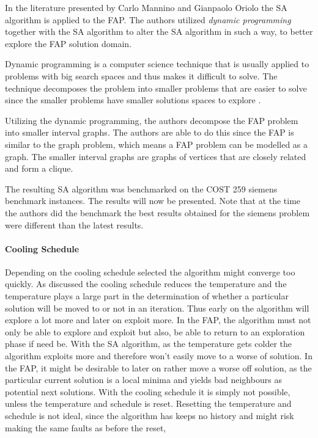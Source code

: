 In the literature presented by Carlo Mannino and Gianpaolo Oriolo\cite{SolvingSuperIntervalGraphs} the SA algorithm is applied to the FAP. The authors utilized \emph{dynamic programming} together with the SA algorithm to alter the SA algorithm in such a way, to better explore the FAP solution domain.

Dynamic programming is a computer science technique that is usually applied to problems with big search spaces and thus makes it difficult to solve\cite{AIModernApproach}. The technique decomposes the problem into smaller problems that are easier to solve since the smaller problems have smaller solutions spaces to explore \cite{AIModernApproach,IntroMathProgramming}.

Utilizing the dynamic programming, the authors decompose the FAP problem into smaller interval graphs. The authors are able to do this since the FAP is similar to the graph problem, which means a FAP problem can be modelled as a graph\cite{ProblemDecompMIFAP}. The smaller interval graphs are graphs of vertices that are closely related and form a clique\cite{ProblemDecompMIFAP}.

The resulting SA algorithm was benchmarked on the COST 259 siemens benchmark instances. The results will now be presented. Note that at the time the authors did the benchmark the best results obtained for the siemens problem were different than the latest results.
\paragraph{Cooling Schedule}
Depending on the cooling schedule selected the algorithm might converge too quickly. As discussed the cooling schedule reduces the temperature and the temperature plays a large part in the determination of whether a particular solution will be moved to or not in an iteration. Thus early on the algorithm will explore a lot more and later on exploit more. In the FAP, the algorithm must not only be able to explore and exploit but also, be able to return to an exploration phase if need be.
With the SA algorithm, as the temperature gets colder the algorithm exploits more and therefore won't easily move to a worse of solution. In the FAP, it might be desirable to later on rather move a worse off solution, as the particular current solution is a local minima and yields bad neighbours as potential next solutions. With the cooling schedule it is simply not possible, unless the temperature and schedule is reset. Resetting the temperature and schedule is not ideal, since the algorithm has keeps no history and might risk making the same faults as before the reset,
